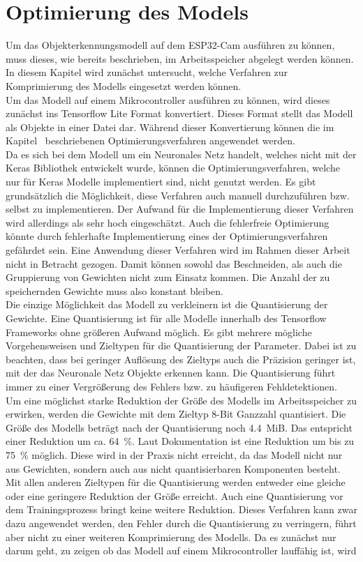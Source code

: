\section{Optimierung des Models} 
    Um das Objekterkennungsmodell auf dem ESP32-Cam ausführen zu können, muss dieses, wie bereits beschrieben, im Arbeitsspeicher abgelegt werden können. In diesem Kapitel wird zunächst untersucht, welche Verfahren zur Komprimierung des Modells eingesetzt werden können.\\ Um das Modell auf einem Mikrocontroller ausführen zu können, wird dieses zunächst ins Tensorflow Lite Format konvertiert. Dieses Format stellt das Modell als Objekte in einer Datei dar. Während dieser Konvertierung können die im Kapitel~ beschriebenen Optimierungsverfahren angewendet werden.\\ Da es sich bei dem Modell um ein Neuronales Netz handelt, welches nicht mit der Keras Bibliothek entwickelt wurde, können die Optimierungsverfahren, welche nur für Keras Modelle implementiert sind, nicht genutzt werden. Es gibt grundsätzlich die Möglichkeit, diese Verfahren auch manuell durchzuführen bzw. selbst zu implementieren. Der Aufwand für die Implementierung dieser Verfahren wird allerdings als sehr hoch eingeschätzt. Auch die fehlerfreie Optimierung könnte durch fehlerhafte Implementierung eines der Optimierungsverfahren gefährdet sein. Eine Anwendung dieser Verfahren wird im Rahmen dieser Arbeit nicht in Betracht gezogen. Damit können sowohl das Beschneiden, als auch die Gruppierung von Gewichten nicht zum Einsatz kommen. Die Anzahl der zu speichernden Gewichte muss also konstant bleiben.\\ Die einzige Möglichkeit das Modell zu verkleinern ist die Quantisierung der Gewichte. Eine Quantisierung ist für alle Modelle innerhalb des Tensorflow Frameworks ohne größeren Aufwand möglich. Es gibt mehrere mögliche Vorgehensweisen und Zieltypen für die Quantisierung der Parameter. Dabei ist zu beachten, dass bei geringer Auflösung des Zieltyps auch die Präzision geringer ist, mit der das Neuronale Netz Objekte erkennen kann. Die Quantisierung führt immer zu einer Vergrößerung des Fehlers bzw. zu häufigeren Fehldetektionen.\\ Um eine möglichst starke Reduktion der Größe des Modells im Arbeitsspeicher zu erwirken, werden die Gewichte mit dem Zieltyp 8-Bit Ganzzahl quantisiert. Die Größe des Modells beträgt nach der Quantisierung noch \SI{4,4}{MiB}. Das entspricht einer Reduktion um ca. \SI{64}{\%}. Laut Dokumentation ist eine Reduktion um bis zu \SI{75}{\%} möglich. Diese wird in der Praxis nicht erreicht, da das Modell nicht nur aus Gewichten, sondern auch aus nicht quantisierbaren Komponenten besteht.\\ Mit allen anderen Zieltypen für die Quantisierung werden entweder eine gleiche oder eine geringere Reduktion der Größe erreicht. Auch eine Quantisierung vor dem Trainingsprozess bringt keine weitere Reduktion. Dieses Verfahren kann zwar dazu angewendet werden, den Fehler durch die Quantisierung zu verringern, führt aber nicht zu einer weiteren Komprimierung des Modells. Da es zunächst nur darum geht, zu zeigen ob das Modell auf einem Mikrocontroller lauffähig ist, wird 